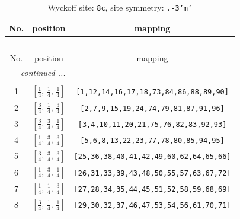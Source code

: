 \documentclass[fleqn,8pt]{jsarticle}
\begin{document}
\begin{longtable}{ccc}
\caption{Wyckoff site: {\tt 8c}, site symmetry: {\tt .-3'm'}}
 \\
 \hline \hline
No. & position & mapping \\ \hline \endfirsthead

\multicolumn{2}{l}{\tablename\ \thetable{}} \\
 \hline \hline
No. & position & mapping \\ \hline \endhead

 \hline \hline
\multicolumn{2}{r}{\footnotesize\it continued ...} \\ \endfoot

 \hline \hline
\multicolumn{2}{r}{} \\ \endlastfoot

1 & $\left[ \frac{1}{4},\, \frac{1}{4},\, \frac{1}{4} \right]$ & {\tt [1,12,14,16,17,18,73,84,86,88,89,90]} \\ \hline
2 & $\left[ \frac{3}{4},\, \frac{1}{4},\, \frac{3}{4} \right]$ & {\tt [2,7,9,15,19,24,74,79,81,87,91,96]} \\ \hline
3 & $\left[ \frac{3}{4},\, \frac{3}{4},\, \frac{1}{4} \right]$ & {\tt [3,4,10,11,20,21,75,76,82,83,92,93]} \\ \hline
4 & $\left[ \frac{1}{4},\, \frac{3}{4},\, \frac{3}{4} \right]$ & {\tt [5,6,8,13,22,23,77,78,80,85,94,95]} \\ \hline
5 & $\left[ \frac{3}{4},\, \frac{3}{4},\, \frac{3}{4} \right]$ & {\tt [25,36,38,40,41,42,49,60,62,64,65,66]} \\ \hline
6 & $\left[ \frac{1}{4},\, \frac{3}{4},\, \frac{1}{4} \right]$ & {\tt [26,31,33,39,43,48,50,55,57,63,67,72]} \\ \hline
7 & $\left[ \frac{1}{4},\, \frac{1}{4},\, \frac{3}{4} \right]$ & {\tt [27,28,34,35,44,45,51,52,58,59,68,69]} \\ \hline
8 & $\left[ \frac{3}{4},\, \frac{1}{4},\, \frac{1}{4} \right]$ & {\tt [29,30,32,37,46,47,53,54,56,61,70,71]} \\
\end{longtable}
\renewcommand{\arraystretch}{1.2}
\end{document}
